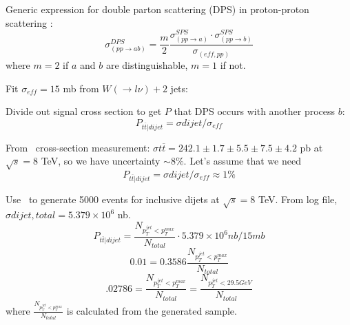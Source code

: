 Generic expression for double parton scattering (DPS) in proton-proton scattering \cite{DPS}:
\begin{equation}
\sigma^{DPS}_{(pp \rightarrow ab)} = \frac{m}{2} \frac {\sigma^{SPS}_{(pp \rightarrow a)} \cdot \sigma^{SPS}_{(pp \rightarrow b)}}{\sigma_{(eff, pp)}}
\end{equation}
where $m=2$ if $a$ and $b$ are distinguishable, $m=1$ if not.

Fit $\sigma_{eff}= 15$ mb  from $W(\rightarrow l \nu ) + 2$ jets\cite{Jpsi}:

Divide out signal cross section to get $P$ that DPS occurs with another process $b$\cite{Jpsi}:
\begin{equation}
P_{t\overline{t} |dijet } = \sigma{dijet} / \sigma_{eff}
\end{equation}

From \ttbar\ cross-section measurement\cite{xsec}: $\sigma {t\overline{t}} = 242.1 \pm 1.7 \pm 5.5 \pm 7.5 \pm 4.2$ pb at $\sqrt{s}=8$ TeV, so we have uncertainty $\sim 8 \%$. Let's assume that we need
\begin{equation}
P_{t\overline{t} |dijet }= \sigma{dijet} / \sigma_{eff} \approx 1 \%
\end{equation}

Use \py\ to generate 5000 events for inclusive dijets at  $\sqrt{s}=8$ TeV. From log file, $ \sigma{dijet, total} = 5.379 \times 10^6$ nb.
\begin{equation}
P_{t\overline{t} |dijet }= \frac{N_{p_{T}^{jet} <p_{T}^{max} }}{N_{total}} \cdot 5.379 \times 10^6 nb / 15 mb 
\end{equation}
\begin{equation}
0.01=  0.3586 \frac{N_{p_{T}^{jet} <p_{T}^{max} }}{N_{total}} 
\end{equation}
\begin{equation}
.02786=\frac{N_{p_{T}^{jet} <p_{T}^{max} }}{N_{total}}=\frac{N_{p_{T}^{jet} <29.5 GeV}}{N_{total}}
\end{equation}
where $\frac{N_{p_{T}^{jet} <p_{T}^{max} }}{N_{total}}$ is calculated from the generated sample.
\clearpage
